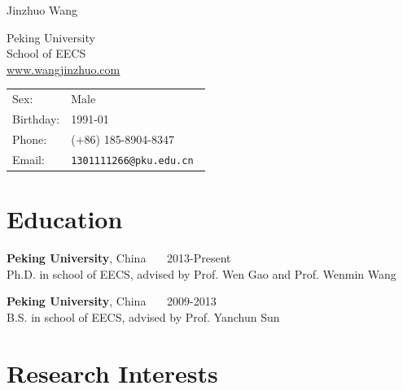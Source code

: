 \documentclass[letterpaper]{article}
\def\name{Jinzhuo Wang}
\renewenvironment{itemize}{
  \begin{list}{}{
    \setlength{\leftmargin}{1.5em}
  }
}{
  \end{list}
}
\begin{document}
{\huge \name}


\vspace{0.25in}


\begin{minipage}{0.45\linewidth}
  Peking University \\
  School of EECS  \\
    \href{www.wangjinzhuo.com}{\underline{www.wangjinzhuo.com}}
\end{minipage}
\begin{minipage}{0.45\linewidth}
  \begin{tabular}{ll}
    Sex: & Male \\
    Birthday: & 1991-01 \\
    Phone: & (+86) 185-8904-8347 \\
    Email: & \tt 1301111266@pku.edu.cn \\
  \end{tabular}
\end{minipage}

%


\section*{Education}

\begin{itemize}
  \item \textbf{Peking University},  China \ \ \ 2013-Present \\
  Ph.D. in school of EECS, advised by Prof. Wen Gao and Prof. Wenmin Wang 
  \item \textbf{Peking University},  China \ \ \ 2009-2013 \\
  B.S. in school of EECS, advised by Prof. Yanchun Sun
\end{itemize}


\section*{Research Interests}
\end{document}
